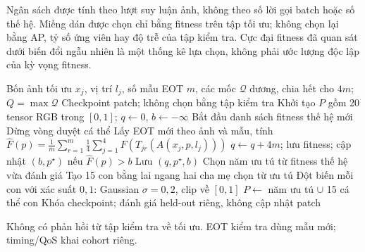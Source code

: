 \documentclass[a4paper,fleqn]{cas-dc}
\begin{document}
Ngân sách được tính theo lượt suy luận ảnh, không theo số lời gọi batch hoặc số thế hệ. Miếng dán được chọn chỉ bằng fitness trên tập tối ưu; không chọn lại bằng AP, tỷ số ứng viên hay độ trễ của tập kiểm tra. Cực đại fitness đã quan sát dưới biến đổi ngẫu nhiên là một thống kê lựa chọn, không phải ước lượng độc lập của kỳ vọng fitness.

\begin{algorithm*}[t]
\caption{SG-GA và khóa miếng dán trước đánh giá độc lập.}
\label{alg:sg_ga}
\begin{algorithmic}[1]
\Require Bốn ảnh tối ưu $x_j$, vị trí $l_j$, số mẫu EOT $m$, các mốc $\mathcal Q$ dương, chia hết cho $4m$; $Q=\max\mathcal Q$
\Ensure Checkpoint patch; không chọn bằng tập kiểm tra
\State Khởi tạo $P$ gồm 20 tensor RGB trong $[0,1]$; $q\gets0$, $b\gets-\infty$
 \State Bắt đầu danh sách fitness thế hệ mới
   \State Dừng vòng duyệt cá thể \EndIf
  \State Lấy EOT mới theo ảnh và mẫu, tính
  \Statex $\displaystyle\widehat F(p)=\frac1m\sum_{r=1}^m\frac14\sum_{j=1}^4F(T_{jr}(A(x_j,p,l_j)))$
  \State $q\gets q+4m$; lưu fitness; cập nhật $(b,p^\star)$ nếu $\widehat F(p)>b$
   \State Lưu $(q,p^\star,b)$ \EndIf
 \EndFor
  \State Chọn năm ưu tú từ fitness thế hệ vừa đánh giá
  \State Tạo 15 con bằng lai ngang hai cha mẹ chọn từ ưu tú
  \State Đột biến mỗi con với xác suất $0{,}1$: Gaussian $\sigma=0{,}2$, clip về $[0,1]$
  \State $P\gets$ năm ưu tú $\cup$ 15 cá thể con
 \EndIf
\EndWhile
\State Khóa checkpoint; đánh giá held-out riêng, không cập nhật patch
\end{algorithmic}
\medskip\centering
{}
\par\smallskip\footnotesize Không có phản hồi từ tập kiểm tra về tối ưu. EOT kiểm tra dùng mẫu mới; timing/QoS khai cohort riêng.
\end{algorithm*}
\end{document}
